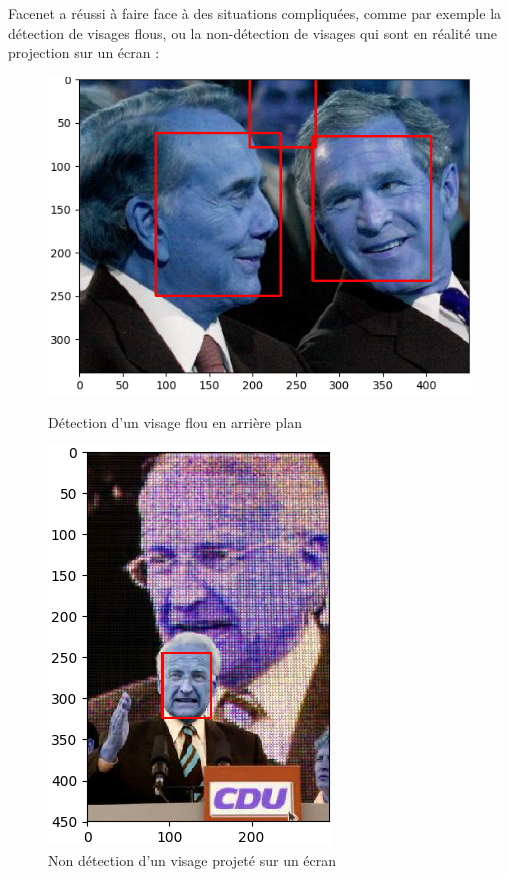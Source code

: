 \documentclass[a4paper,11pt]{article}
\begin{document}
	    Facenet a réussi à faire face à des situations compliquées, comme par exemple la détection de visages flous, ou la non-détection de visages qui sont en réalité une projection sur un écran :\\
	    
	    \begin{figure}[H]
	        \centering
	        \begin{minipage}[c]{0.58\linewidth}
	            \begin{center}
	                \includegraphics[scale=0.45]{facenetTP1.png}
	                \caption{Détection d'un visage flou en arrière plan}
	            \end{center}
	        \end{minipage} \hfill
	        \begin{minipage}[c]{0.35\linewidth}
	            \begin{center}
	                \includegraphics[scale=0.45]{facenetTP2.png}
	                \caption{Non détection d'un visage projeté sur un écran}
	                \label{fig:proj_ecran}
	            \end{center}
	        \end{minipage}
	    \end{figure}
	    
\end{document}
